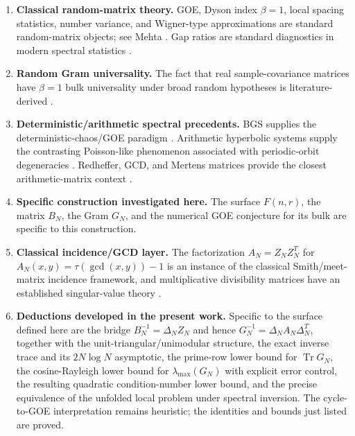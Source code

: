 \documentclass[11pt]{amsart}
\numberwithin{equation}{section}
\theoremstyle{plain}
\theoremstyle{definition}
\theoremstyle{remark}
\newcommand{\Tr}{\operatorname{Tr}}
\begin{document}
\begin{enumerate}[label=(\roman*)]
\item \textbf{Classical random-matrix theory.}  GOE, Dyson index $\beta=1$, local spacing statistics, number variance, and Wigner-type approximations are standard random-matrix objects; see Mehta \cite{Mehta2004}.  Gap ratios are standard diagnostics in modern spectral statistics \cite{OganesyanHuse2007,Atas2013}.

\item \textbf{Random Gram universality.}  The fact that real sample-covariance matrices have $\beta=1$ bulk universality under broad random hypotheses is literature-derived \cite{TaoVu2012,PillaiYin2014}.

\item \textbf{Deterministic/arithmetic spectral precedents.}  BGS supplies the deterministic-chaos/GOE paradigm \cite{BGS1984}.  Arithmetic hyperbolic systems supply the contrasting Poisson-like phenomenon associated with periodic-orbit degeneracies \cite{BogomolnyEtAl1992,LuoSarnak1994}.  Redheffer, GCD, and Mertens matrices provide the closest arithmetic-matrix context \cite{BarrettJarvis1992,HongLoewy2004,Cardinal2010,ClementSteinerberger2025,Kline2019,Kline2020}.

\item \textbf{Specific construction investigated here.}  The surface $F(n,r)$, the matrix $B_N$, the Gram $G_N$, and the numerical GOE conjecture for its bulk are specific to this construction.

\item \textbf{Classical incidence/GCD layer.}
The factorization $A_N=Z_NZ_N^T$ for $A_N(x,y)=\tau(\gcd(x,y))-1$ is an instance of the classical Smith/meet-matrix incidence framework, and multiplicative divisibility matrices have an established singular-value theory \cite{HaukkanenWangSillanpaa1997,KorkeeHaukkanen2003,Hilberdink2017}.
\item \textbf{Deductions developed in the present work.}
Specific to the surface defined here are the bridge $B_N^{-1}=\Delta_NZ_N$ and hence $G_N^{-1}=\Delta_NA_N\Delta_N^T$, together with the unit-triangular/unimodular structure, the exact inverse trace and its $2N\log N$ asymptotic, the prime-row lower bound for $\Tr G_N$, the cosine-Rayleigh lower bound for $\lambda_{\max}(G_N)$ with explicit error control, the resulting quadratic condition-number lower bound, and the precise equivalence of the unfolded local problem under spectral inversion.  The cycle-to-GOE interpretation remains heuristic; the identities and bounds just listed are proved.
\end{enumerate}
\end{document}
